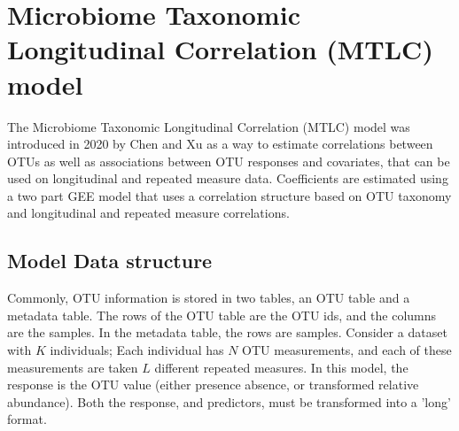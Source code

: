 \documentclass[12pt]{article}
\begin{document}
\section{Microbiome Taxonomic Longitudinal Correlation (MTLC) model}

The Microbiome Taxonomic Longitudinal Correlation (MTLC) model was introduced in 2020 by Chen and Xu\cite{chen2020generalized} as a way to estimate correlations between OTUs as well as associations between OTU responses and covariates, that can be used on longitudinal and repeated measure data. Coefficients are estimated using a two part GEE model that uses a correlation structure based on OTU taxonomy and longitudinal and repeated measure correlations.



\subsection{Model Data structure}
Commonly, OTU information is stored in two tables, an OTU table and a metadata table. The rows of the OTU table are the OTU ids, and the columns are the samples. In the metadata table, the rows are samples. Consider a dataset with $K$ individuals;  Each individual has $N$ OTU measurements, and each of these measurements are taken $L$ different repeated measures. In this model, the response is the OTU value (either presence absence, or transformed relative abundance). Both the response, and predictors, must be transformed into a 'long' format.



\end{document}
